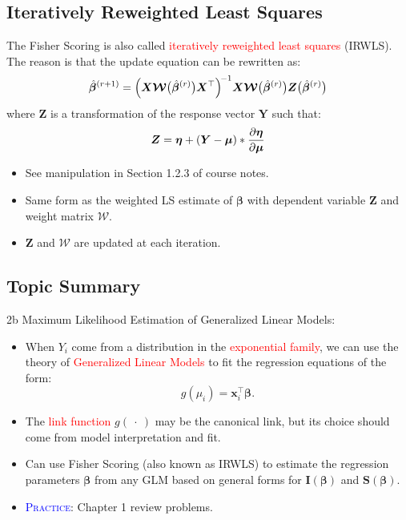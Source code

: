 \documentclass[oneside]{book}\usepackage[]{graphicx}\usepackage[svgnames]{xcolor}
\providecommand{\RandomVector}[1]{\bm{#1}}%
\providecommand{\Vector}[1]{\bm{#1}}%
\providecommand{\Matrix}[1]{\bm{#1}}
\providecommand{\MatrixCal}[1]{\bm{\mathcal{#1}}}
\begin{document}
\subsection*{Iteratively Reweighted Least Squares}
The Fisher Scoring is also called \textcolor{Red}{iteratively reweighted least squares} (IRWLS).
The reason is that the update equation can be rewritten as:
\[ \hat{\Vector{\beta}}^{(r+1)}=\Bigl(\Matrix{X}\MatrixCal{W}\bigl(\hat{\Vector{\beta}}^{(r)}\bigr)\Matrix{X}^\top\Bigr)^{\!-1}\Matrix{X}\MatrixCal{W}\bigl(\hat{\Vector{\beta}}^{(r)}\bigr)\RandomVector{Z}\bigl(\hat{\Vector{\beta}}^{(r)}\bigr) \]
where $ \RandomVector{Z} $ is a transformation of the response vector $ \RandomVector{Y} $ such that:
\[ \RandomVector{Z}=\Vector{\eta}+(\RandomVector{Y}-\Vector{\mu})\ast\pdv{\Vector{\eta}}{\Vector{\mu}} \]
\begin{itemize}
    \item See manipulation in Section 1.2.3 of course notes.
    \item Same form as the weighted LS estimate of $ \Vector{\beta} $ with dependent variable $ \RandomVector{Z} $
          and weight matrix $ \MatrixCal{W} $.
    \item $ \RandomVector{Z} $ and $ \MatrixCal{W} $ are updated at each iteration.
\end{itemize}
\subsection*{Topic Summary}
2b Maximum Likelihood Estimation of Generalized Linear Models:
\begin{itemize}
    \item When $ Y_i $ come from a distribution in the \textcolor{Red}{exponential family}, we can use
          the theory of \textcolor{Red}{Generalized Linear Models} to fit the regression equations of
          the form:
          \[ g(\mu_i)=\Vector{x}_i^\top \Vector{\beta}. \]
    \item The \textcolor{Red}{link function} $ g(\:\cdot\:) $ may be the canonical link, but its choice should
          come from model interpretation and fit.
    \item Can use Fisher Scoring (also known as IRWLS) to estimate the regression parameters $ \Vector{\beta} $ from any GLM based on general forms for $ \Matrix{I}(\Vector{\beta}) $
          and $ \Vector{S}(\Vector{\beta}) $.
    \item \textcolor{Blue}{\textsc{Practice}}: Chapter 1 review problems.
\end{itemize}
\end{document}
